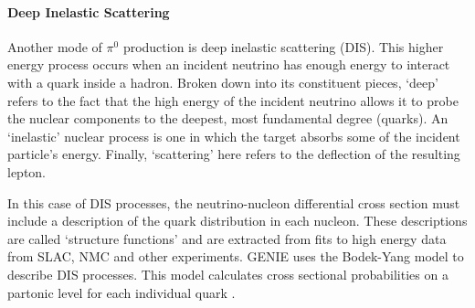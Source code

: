 
\paragraph{Deep Inelastic Scattering} Another mode of $\pi^0$ production is deep inelastic scattering (DIS). This higher energy process occurs when an incident neutrino has enough energy to interact with a quark inside a hadron. Broken down into its constituent pieces, `deep' refers to the fact that the high energy of the incident neutrino allows it to probe the nuclear components to the deepest, most fundamental degree (quarks). An `inelastic' nuclear process is one in which the target absorbs some of the incident particle's energy. Finally, `scattering' here refers to the deflection of the resulting lepton. 
\par In this case of DIS processes, the neutrino-nucleon differential cross section must include a description of the quark distribution in each nucleon.  These descriptions are called `structure functions' and are extracted from fits to high energy data from SLAC, NMC and other experiments. GENIE uses the Bodek-Yang model to describe DIS processes.  This model calculates cross sectional probabilities on a partonic level for each individual quark \cite{bib:bodek_yang0}.  

